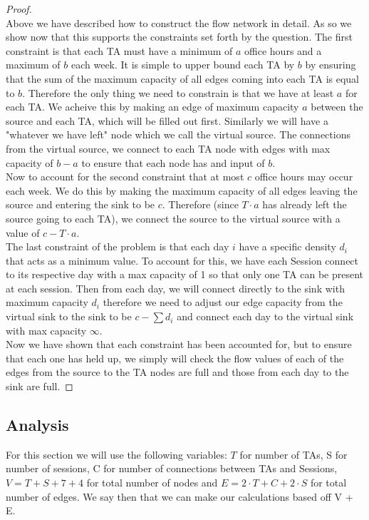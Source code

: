 \documentclass[12pt]{article}
\begin{document}
\begin{proof}
~ \\ \indent Above we have described how to construct the flow network in detail. As so we
show now that this supports the constraints set forth by the question. The first constraint
is that each TA must have a minimum of $a$ office hours and a maximum of $b$ each week. It is
simple to upper bound each TA by $b$ by ensuring that the sum of the maximum capacity of all
edges coming into each TA is equal to $b$. Therefore the only thing we need to constrain is
that we have at least $a$ for each TA. We acheive this by making an edge of maximum capacity
$a$ between the source and each TA, which will be filled out first. Similarly we will have a
"whatever we have left" node which we call the virtual source. The connections from the
virtual source, we connect to each TA node with edges with max capacity of $b-a$ to ensure
that each node has and input of $b$. \\
\indent Now to account for the second constraint that at most $c$ office hours may occur each
week. We do this by making the maximum capacity of all edges leaving the source and entering
the sink to be $c$. Therefore (since $T\cdot a$ has already left the source going to each TA),
we connect the source to the virtual source with a value of $c - T\cdot a$. \\
\indent The last constraint of the problem is that each day $i$ have a specific density $d_i$
that acts as a minimum value. To account for this, we have each Session connect to its
respective day with a max capacity of 1 so that only one TA can be present at each session.
Then from each day, we will connect directly to the sink with maximum capacity $d_i$ therefore
we need to adjust our edge capacity from the virtual sink to the sink to be $c - \sum d_i$ and
connect each day to the virtual sink with max capacity $\infty$. \\
\indent Now we have shown that each constraint has been accounted for, but to ensure that each
one has held up, we simply will check the flow values of each of the edges from the source to
the TA nodes are full and those from each day to the sink are full.
\end{proof}


\subsection{Analysis}
For this section we will use the following variables: $T$ for number of TAs, S for number of
sessions, C for number of connections between TAs and Sessions, $V = T + S + 7 + 4$ for total
number of nodes and $E = 2\cdot T + C + 2\cdot S$ for total number of edges. We say then that
we can make our calculations based off V + E.
\end{document}
